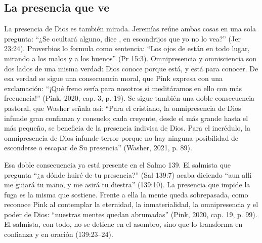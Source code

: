 \subsection{La presencia que ve}

La presencia de Dios es también mirada. Jeremías reúne ambas cosas en una sola pregunta: ``¿Se ocultará alguno, dice \SENOR{}, en escondrijos que yo no lo vea?'' (Jer 23:24). Proverbios lo formula como sentencia: ``Los ojos de \SENOR{} están en todo lugar, mirando a los malos y a los buenos'' (Pr 15:3). Omnipresencia y omnisciencia son dos lados de una misma verdad: Dios conoce porque está, y está para conocer. De esa verdad se sigue una consecuencia moral, que Pink expresa con una exclamación: ``¡Qué freno sería para nosotros si meditáramos en ello con más frecuencia!'' (Pink, 2020, cap. 3, p. 19). Se sigue también una doble consecuencia pastoral, que Washer señala así: ``Para el cristiano, la omnipresencia de Dios infunde gran confianza y consuelo; cada creyente, desde el más grande hasta el más pequeño, se beneficia de la presencia indivisa de Dios. Para el incrédulo, la omnipresencia de Dios infunde terror porque no hay ninguna posibilidad de esconderse o escapar de Su presencia'' (Washer, 2021, p. 89).

Esa doble consecuencia ya está presente en el Salmo 139. El salmista que pregunta ``¿a dónde huiré de tu presencia?'' (Sal 139:7) acaba diciendo ``aun allí me guiará tu mano, y me asirá tu diestra'' (139:10). La presencia que impide la fuga es la misma que sostiene. Frente a ella la mente queda sobrepasada, como reconoce Pink al contemplar la eternidad, la inmaterialidad, la omnipresencia y el poder de Dios: ``nuestras mentes quedan abrumadas'' (Pink, 2020, cap. 19, p. 99). El salmista, con todo, no se detiene en el asombro, sino que lo transforma en confianza y en oración (139:23--24).

